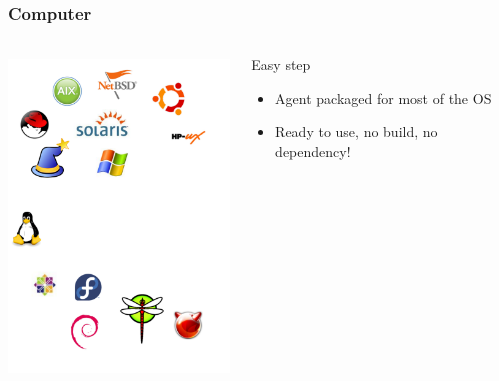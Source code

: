 \documentclass{beamer}
\begin{document}
\begin{frame}

    \frametitle{Computer}
 \begin{columns}
 \begin{column}{0.15\textwidth}
         \includegraphics[height=8.5cm]{./pics/os.pdf}
 \end{column}
 \begin{column}{1.25\textwidth}
    \begin{block}{Easy step}
        \begin{itemize}
            \item Agent packaged for most of the OS
            \item Ready to use, no build, no dependency!
        \end{itemize}
    \end{block}


 \end{column}
\end{columns}




\end{frame}
\end{document}
